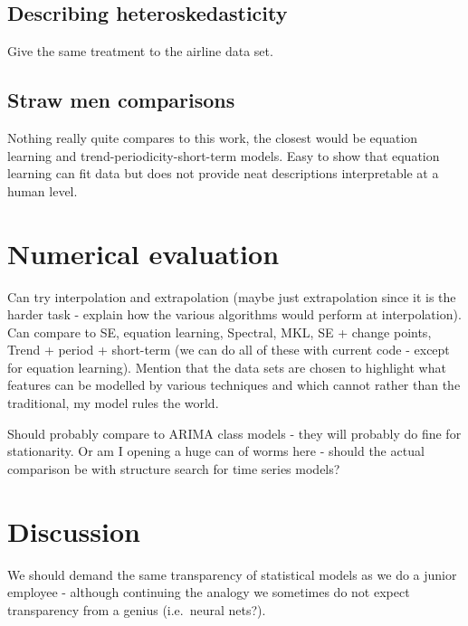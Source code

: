 \documentclass{article}
\def\ie{i.e.\ }
\def\eg{e.g.\ }
\begin{document}
\subsection{Describing heteroskedasticity}
\label{sec:airline}

Give the same treatment to the airline data set.

\subsection{Straw men comparisons}

Nothing really quite compares to this work, the closest would be equation learning and trend-periodicity-short-term models.
Easy to show that equation learning can fit data but does not provide neat descriptions interpretable at a human level.

\section{Numerical evaluation}
\label{sec:numerical}

Can try interpolation and extrapolation (maybe just extrapolation since it is the harder task - explain how the various algorithms would perform at interpolation).
Can compare to SE, equation learning, Spectral, MKL, SE + change points, Trend + period + short-term (we can do all of these with current code - except for equation learning).
Mention that the data sets are chosen to highlight what features can be modelled by various techniques and which cannot rather than the traditional, my model rules the world.

Should probably compare to ARIMA class models - they will probably do fine for stationarity.
Or am I opening a huge can of worms here - should the actual comparison be with structure search for time series models?



\section{Discussion}

We should demand the same transparency of statistical models as we do a junior employee - although continuing the analogy we sometimes do not expect transparency from a genius (\ie neural nets?).
\end{document}
